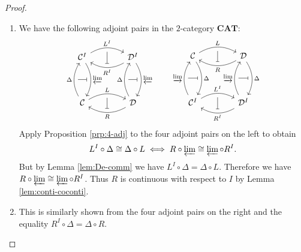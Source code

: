 \documentclass{surv-l}
\numberwithin{equation}{chapter}
\numberwithin{figure}{chapter}
\theoremstyle{plain}
\theoremstyle{definition}
\theoremstyle{remark}
\begin{document}
\begin{proof}\leavevmode
\begin{enumerate}[wide]
\item We have the following adjoint pairs in the $2$-category $\mathbf{CAT}$:
\[
\begin{tikzcd}[row sep=4em, column sep=4em]
{\mathcal{C}}^I \ar[r, bend left, "L^I", ""'{name=D-l}] \ar[d, bend left, "\varprojlim", ""'{name=L-g}]
& {\mathcal{D}}^I \ar[l, bend left, "R^I", ""'{name=U-r}] \ar[d, bend left, "\varprojlim", ""'{name=L-g'}]\\
{\mathcal{C}} \ar[r, bend left, "L", ""'{name=D-l'}] \ar[u, bend left, "\Delta", ""'{name=R-f}]
& {\mathcal{D}} \ar[l, bend left, "R", ""'{name=U-r'}] \ar[u, bend left, "\Delta", ""'{name=R-f'}]
\ar[r, from=D-l, to=U-r, -|]
\ar[r, from=D-l', to=U-r', -|]
\ar[r, from=R-f, to=L-g, -|]
\ar[r, from=R-f', to=L-g', -|]
\end{tikzcd}
\qquad
\begin{tikzcd}[row sep=4em, column sep=4em]
{\mathcal{C}} \ar[r, bend left, "L", ""'{name=D-l}] \ar[d, bend left, "\Delta", ""'{name=L-g}]
& {\mathcal{D}} \ar[l, bend left, "R", ""'{name=U-r}] \ar[d, bend left, "\Delta", ""'{name=L-g'}]\\
{\mathcal{C}}^I \ar[r, bend left, "L^I", ""'{name=D-l'}] \ar[u, bend left, "\varinjlim", ""'{name=R-f}]
& {\mathcal{D}}^I \ar[l, bend left, "R^I", ""'{name=U-r'}] \ar[u, bend left, "\varinjlim", ""'{name=R-f'}]
\ar[r, from=D-l, to=U-r, mapsfrom, no tail]
\ar[r, from=D-l', to=U-r', mapsfrom, no tail]
\ar[r, from=R-f, to=L-g, mapsfrom, no tail]
\ar[r, from=R-f', to=L-g', mapsfrom, no tail]
\end{tikzcd}
\]
Apply Proposition \ref{prp:4-adj} to the four adjoint pairs on the left
to obtain
\[
L^I \circ \Delta \cong \Delta \circ L \iff R\circ \varprojlim \cong \varprojlim \circ R^I.
\]
But by Lemma  \ref{lem:De-comm} we have
$L^I \circ \Delta = \Delta \circ L$.
Therefore we have $R\circ \varprojlim \cong \varprojlim \circ R^I$.
Thus $R$ is continuous with respect to $I$ by Lemma  \ref{lem:conti-coconti}.

\item This is similarly shown from the four adjoint pairs on the right and
the equality $R^I\circ \Delta = \Delta \circ R$.
\end{enumerate}
\end{proof}
\end{document}
